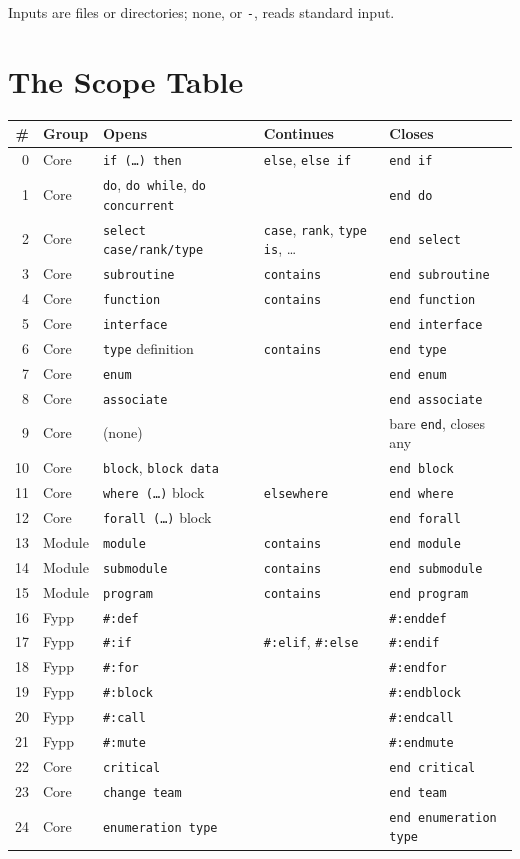 \documentclass[11pt,a4paper,openany]{book}
\newcommand{\code}[1]{\texttt{\small #1}}
\begin{document}
Inputs are files or directories; none, or \code{-}, reads standard input.

\chapter{The Scope Table}\label{app:scopes}

\begin{center}
\small
\footnotesize
\begin{tabular}{@{}r l l l l@{}}
\toprule
\# & Group & Opens & Continues & Closes\\
\midrule
0 & Core & \code{if (\ldots) then} & \code{else}, \code{else if} & \code{end if}\\
1 & Core & \code{do}, \code{do while}, \code{do concurrent} & & \code{end do}\\
2 & Core & \code{select case/rank/type} & \code{case}, \code{rank}, \code{type is}, \ldots & \code{end select}\\
3 & Core & \code{subroutine} & \code{contains} & \code{end subroutine}\\
4 & Core & \code{function} & \code{contains} & \code{end function}\\
5 & Core & \code{interface} & & \code{end interface}\\
6 & Core & \code{type} definition & \code{contains} & \code{end type}\\
7 & Core & \code{enum} & & \code{end enum}\\
8 & Core & \code{associate} & & \code{end associate}\\
9 & Core & (none) & & bare \code{end}, closes any\\
10 & Core & \code{block}, \code{block data} & & \code{end block}\\
11 & Core & \code{where (\ldots)} block & \code{elsewhere} & \code{end where}\\
12 & Core & \code{forall (\ldots)} block & & \code{end forall}\\
13 & Module & \code{module} & \code{contains} & \code{end module}\\
14 & Module & \code{submodule} & \code{contains} & \code{end submodule}\\
15 & Module & \code{program} & \code{contains} & \code{end program}\\
16 & Fypp & \code{\#:def} & & \code{\#:enddef}\\
17 & Fypp & \code{\#:if} & \code{\#:elif}, \code{\#:else} & \code{\#:endif}\\
18 & Fypp & \code{\#:for} & & \code{\#:endfor}\\
19 & Fypp & \code{\#:block} & & \code{\#:endblock}\\
20 & Fypp & \code{\#:call} & & \code{\#:endcall}\\
21 & Fypp & \code{\#:mute} & & \code{\#:endmute}\\
22 & Core & \code{critical} & & \code{end critical}\\
23 & Core & \code{change team} & & \code{end team}\\
24 & Core & \code{enumeration type} & & \code{end enumeration type}\\
\bottomrule
\end{tabular}
\end{center}
\end{document}
